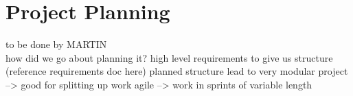 \section{Project Planning}
to be done by MARTIN\\
how did we go about planning it?
high level requirements to give us structure (reference requirements doc here)
planned structure lead to very modular project --> good for splitting up work
agile --> work in sprints of variable length
